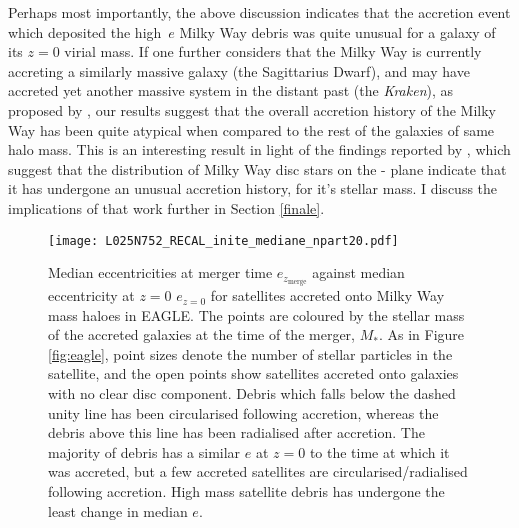Perhaps most importantly, the above discussion indicates that the
accretion event which deposited the high~$e$ Milky Way debris was
quite unusual for a galaxy of its $z=0$ virial mass.  If one further
considers that the Milky Way is currently accreting a similarly
massive galaxy (the Sagittarius Dwarf), and may have accreted
yet another massive system in the distant past (the \emph{Kraken}),
as proposed by \citet{2018MNRAS.tmp.1537K}, our results suggest
that the overall accretion history of the Milky Way has been quite
atypical when compared to the rest of the galaxies of same halo
mass. This is an interesting result in light of the findings reported
by \citet{2018MNRAS.477.5072M}, which suggest that the
distribution of Milky Way disc stars on the \afe{}-\feh{} plane
indicate that it has undergone an unusual accretion history, for
it's stellar mass.  I discuss the implications of that work further
in Section \ref{finale}.

\begin{figure}
\texttt{[image: L025N752\_RECAL\_inite\_mediane\_npart20.pdf]}
\caption[The change in median eccentricity between $z=0$ and the time immediately after merger for satellite debris accreted onto Milky Way mass haloes in the Recal-L025N0752 simulation]{\label{fig:echange} Median eccentricities at merger time
$e_{z_\mathrm{merge}}$ against median eccentricity at $z=0$ $e_{z=0}$
for satellites accreted onto Milky Way mass haloes in EAGLE. The
points are coloured by the stellar mass of the accreted galaxies
at the time of the merger, $M_*$.  As in Figure \ref{fig:eagle},
point sizes denote the number of stellar particles in the satellite,
and the open points show satellites accreted onto galaxies with no
clear disc component.  Debris which falls below the dashed unity
line has been circularised following accretion, whereas the debris
above this line has been radialised after accretion. The majority
of debris has a similar $e$ at $z=0$ to the time at which it was
accreted, but a few accreted satellites are circularised/radialised
following accretion. High mass satellite debris has undergone the
least change in median $e$.}
\end{figure}


